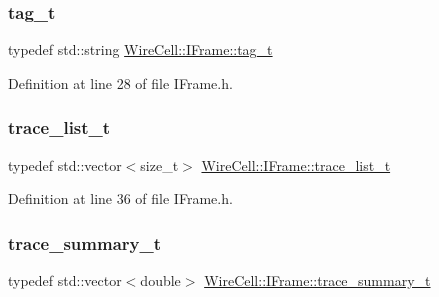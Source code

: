 \mbox{\label{class_wire_cell_1_1_i_frame_ae206ba618e10f398625dfeb675a4215a}} 
\subsubsection{\texorpdfstring{tag\+\_\+t}{tag\_t}}
{\footnotesize\ttfamily typedef std\+::string \hyperlink{class_wire_cell_1_1_i_frame_ae206ba618e10f398625dfeb675a4215a}{Wire\+Cell\+::\+I\+Frame\+::tag\+\_\+t}}



Definition at line 28 of file I\+Frame.\+h.

\mbox{\label{class_wire_cell_1_1_i_frame_a12f08adf79d21cb9b4862a16193fda8f}} 
\subsubsection{\texorpdfstring{trace\+\_\+list\+\_\+t}{trace\_list\_t}}
{\footnotesize\ttfamily typedef std\+::vector$<$size\+\_\+t$>$ \hyperlink{class_wire_cell_1_1_i_frame_a12f08adf79d21cb9b4862a16193fda8f}{Wire\+Cell\+::\+I\+Frame\+::trace\+\_\+list\+\_\+t}}



Definition at line 36 of file I\+Frame.\+h.

\mbox{\label{class_wire_cell_1_1_i_frame_ad65f8b090c2607591e44d7b40777517e}} 
\subsubsection{\texorpdfstring{trace\+\_\+summary\+\_\+t}{trace\_summary\_t}}
{\footnotesize\ttfamily typedef std\+::vector$<$double$>$ \hyperlink{class_wire_cell_1_1_i_frame_ad65f8b090c2607591e44d7b40777517e}{Wire\+Cell\+::\+I\+Frame\+::trace\+\_\+summary\+\_\+t}}



